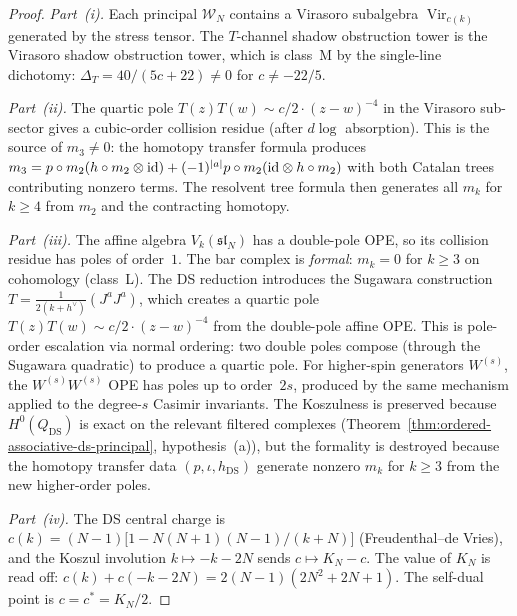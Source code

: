 \begin{proof}
\emph{Part~(i).}
Each principal $\mathcal{W}_N$ contains a Virasoro subalgebra
$\operatorname{Vir}_{c(k)}$ generated by the stress tensor. The
$T$-channel shadow obstruction tower is the Virasoro shadow obstruction tower, which is
class~M by the single-line dichotomy:
$\Delta_T = 40/(5c+22) \neq 0$ for $c \neq -22/5$.

\emph{Part~(ii).}
The quartic pole $T(z)T(w) \sim c/2 \cdot (z{-}w)^{-4}$ in the
Virasoro sub-sector gives a cubic-order collision residue
(after $d\log$ absorption). This is the source of $m_3 \neq 0$:
the homotopy transfer formula produces $m_3 = p \circ m_2(h \circ
m_2 \otimes \mathrm{id}) + (-1)^{|a|} p \circ m_2(\mathrm{id} \otimes h \circ m_2)$
with both Catalan trees contributing nonzero terms. The
resolvent tree formula then generates all $m_k$ for $k \geq 4$ from
$m_2$ and the contracting homotopy.

\emph{Part~(iii).}
The affine algebra $V_k(\mathfrak{sl}_N)$ has a double-pole OPE,
so its collision residue has poles of order~$1$. The bar complex is
\emph{formal}: $m_k = 0$ for $k \geq 3$ on cohomology
(class~L). The DS reduction introduces the Sugawara construction
$T = \frac{1}{2(k+h^\vee)} (J^a J^a)$, which creates a
quartic pole $T(z)T(w) \sim c/2 \cdot (z{-}w)^{-4}$ from the
double-pole affine OPE. This is pole-order escalation via
normal ordering: two double poles compose (through the Sugawara
quadratic) to produce a quartic pole. For higher-spin generators
$W^{(s)}$, the $W^{(s)} W^{(s)}$ OPE has poles up to order~$2s$,
produced by the same mechanism applied to the degree-$s$ Casimir
invariants. The Koszulness is preserved because $H^0(Q_{\mathrm{DS}})$
is exact on the relevant filtered complexes
(Theorem~\ref{thm:ordered-associative-ds-principal}, hypothesis~(a)),
but the formality is destroyed because the homotopy transfer data
$(p, \iota, h_{\mathrm{DS}})$ generate nonzero $m_k$ for $k \geq 3$
from the new higher-order poles.

\emph{Part~(iv).}
The DS central charge is
$c(k) = (N{-}1)\bigl[1 - N(N{+}1)(N{-}1)/(k{+}N)\bigr]$
(Freudenthal--de Vries), and the Koszul involution
$k \mapsto -k - 2N$ sends $c \mapsto K_N - c$. The value of
$K_N$ is read off: $c(k) + c(-k{-}2N) = 2(N{-}1)(2N^2{+}2N{+}1)$.
The self-dual point is $c = c^* = K_N/2$.
\end{proof}

